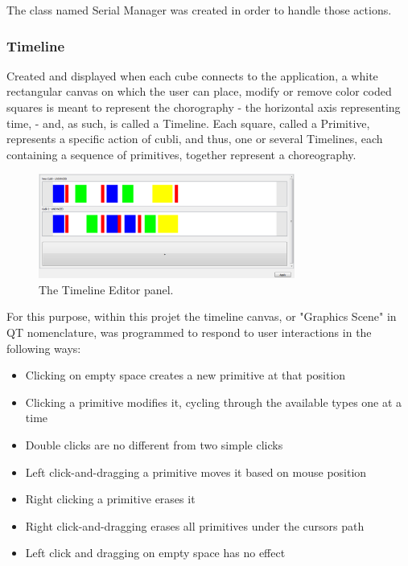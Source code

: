 The class named Serial Manager was created in order to handle those actions. 

\subsubsection{Timeline}

Created and displayed when each cube connects to the application, a white rectangular canvas on which the user can place, modify or remove color coded squares is meant to represent the chorography - the horizontal axis representing time, - and, as such, is called a Timeline. Each square, called a Primitive, represents a specific action of cubli, and thus, one or several Timelines, each containing a sequence of primitives, together represent a choreography. \\

\begin{figure}[ht]
   \centering
   \includegraphics[width=0.75\textwidth]{img/TimelinesPanel.png}
   \caption{The Timeline Editor panel.}
   \label{img:TimelinesPanel}
\end{figure}

For this purpose, within this projet the timeline canvas, or "Graphics Scene" in QT nomenclature, was programmed to respond to user interactions in the following ways: 
\begin{itemize}
\item Clicking on empty space creates a new primitive at that position 
\item Clicking a primitive modifies it, cycling through the available types one at a time 
\item Double clicks are no different from two simple clicks 
\item Left click-and-dragging a primitive moves it based on mouse position 
\item Right clicking a primitive erases it 
\item Right click-and-dragging erases all primitives under the cursors path 
\item Left click and dragging on empty space has no effect 
\end{itemize}

